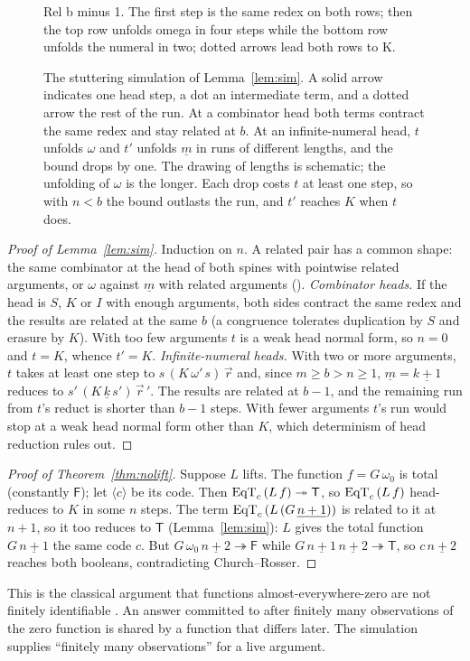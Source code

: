 \documentclass[acmsmall,review,screen]{acmart}\def\acmclass{}
\theoremstyle{plain}
\theoremstyle{definition}
\theoremstyle{remark}
\newcommand{\code}[1]{\langle #1\rangle}
\newcommand{\red}{\twoheadrightarrow}
\newcommand{\fn}[1]{\textup{#1}}  %
\newcommand{\T}{\mathsf{T}}
\newcommand{\F}{\mathsf{F}}
\newcommand{\num}[1]{\underline{#1}}
\begin{document}
\begin{figure}[tb]
{Rel b minus 1.  The first step is the same redex on both rows; then the top row unfolds
omega in four steps while the bottom row unfolds the numeral in two; dotted arrows lead
both rows to K.}\fi
\caption{The stuttering simulation of Lemma~\ref{lem:sim}.  A solid arrow indicates one head
step, a dot an intermediate term, and a dotted arrow the rest of the run.  At a combinator
head both terms contract the same redex and stay related at $b$.
At an infinite-numeral head, $t$ unfolds $\omega$ and $t'$ unfolds $\num{m}$ in runs
of different lengths, and the bound drops by one.  The drawing of lengths is schematic;
the unfolding of $\omega$ is the longer.  Each drop costs $t$ at least one
step, so with $n<b$ the bound outlasts the run, and $t'$ reaches $K$ when $t$ does.}
\label{fig:sim}
\end{figure}
\begin{proof}[Proof of Lemma~\ref{lem:sim}]
Induction on $n$.  A related pair has a common shape: the same combinator at the head
of both spines with pointwise related arguments, or $\omega$ against $\num{m}$ with
related arguments ().
\emph{Combinator heads.}  If the head is $S$, $K$ or $I$ with enough arguments, both
sides contract the same redex and the results are related at the same $b$ (a
congruence tolerates duplication by $S$ and erasure by $K$).  With too few arguments
$t$ is a weak head normal form, so $n=0$ and $t=K$, whence $t'=K$.
\emph{Infinite-numeral heads.}  With two or more arguments, $t$ takes at least one step
to $s\,(K\,\omega'\,s)\,\vec r$ and, since $m\ge b>n\ge 1$, $\num{m} = \num{k+1}$
reduces to $s'\,(K\,\num{k}\,s')\,\vec r\,'$.  The results are related at $b-1$, and
the remaining run from $t$'s reduct is shorter than $b-1$ steps.  With fewer
arguments $t$'s run would stop at a weak head normal form other than $K$, which
determinism of head reduction rules out.
\end{proof}

\begin{proof}[Proof of Theorem~\ref{thm:nolift}]
Suppose $L$ lifts.  The function $f = G\,\omega_0$ is total (constantly $\F$); let
$\code{c}$ be its code.  Then $\fn{EqT}_c\,(L\,f)\red\T$, so
$\fn{EqT}_c\,(L\,f)$ head-reduces to $K$ in some $n$ steps.  The term
$\fn{EqT}_c\,(L\,(G\,\num{n+1}))$ is related to it at $n+1$, so it too reduces to
$\T$ (Lemma~\ref{lem:sim}): $L$ gives the total function $G\,\num{n+1}$ the same
code $c$.  But $G\,\omega_0\,\num{n+2}\red\F$ while
$G\,\num{n+1}\,\num{n+2}\red\T$, so $c\,\num{n+2}$ reaches both booleans, contradicting
Church--Rosser.
\end{proof}
This is the classical argument that functions almost-everywhere-zero are not
finitely identifiable \citep{Balbach2020}.  An answer committed to after finitely many
observations of the zero function is shared by a function that differs later.  The
simulation supplies ``finitely many observations'' for a live argument.
\end{document}
